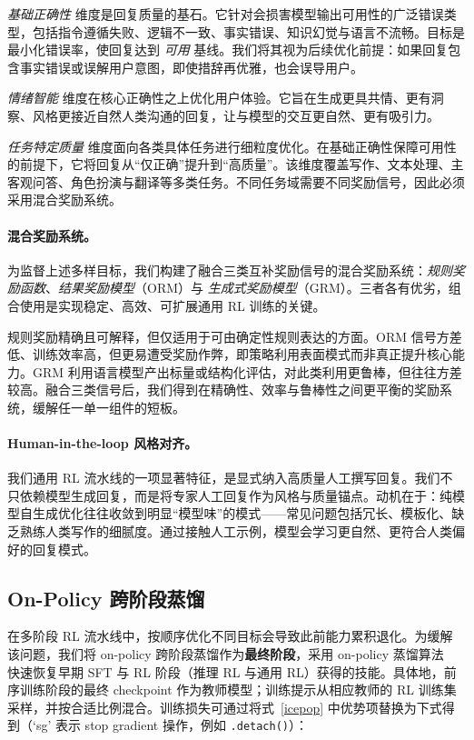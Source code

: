 \emph{基础正确性} 维度是回复质量的基石。它针对会损害模型输出可用性的广泛错误类型，包括指令遵循失败、逻辑不一致、事实错误、知识幻觉与语言不流畅。目标是最小化错误率，使回复达到 \emph{可用} 基线。我们将其视为后续优化前提：如果回复包含事实错误或误解用户意图，即使措辞再优雅，也会误导用户。

\emph{情绪智能} 维度在核心正确性之上优化用户体验。它旨在生成更具共情、更有洞察、风格更接近自然人类沟通的回复，让与模型的交互更自然、更有吸引力。

\emph{任务特定质量} 维度面向各类具体任务进行细粒度优化。在基础正确性保障可用性的前提下，它将回复从“仅正确”提升到“高质量”。该维度覆盖写作、文本处理、主客观问答、角色扮演与翻译等多类任务。不同任务域需要不同奖励信号，因此必须采用混合奖励系统。

\paragraph{混合奖励系统。}
为监督上述多样目标，我们构建了融合三类互补奖励信号的混合奖励系统：\emph{规则奖励函数}、\emph{结果奖励模型}（ORM）与 \emph{生成式奖励模型}（GRM）。三者各有优劣，组合使用是实现稳定、高效、可扩展通用 RL 训练的关键。

规则奖励精确且可解释，但仅适用于可由确定性规则表达的方面。ORM 信号方差低、训练效率高，但更易遭受奖励作弊，即策略利用表面模式而非真正提升核心能力。GRM 利用语言模型产出标量或结构化评估，对此类利用更鲁棒，但往往方差较高。融合三类信号后，我们得到在精确性、效率与鲁棒性之间更平衡的奖励系统，缓解任一单一组件的短板。

\paragraph{Human-in-the-loop 风格对齐。}
我们通用 RL 流水线的一项显著特征，是显式纳入高质量人工撰写回复。我们不只依赖模型生成回复，而是将专家人工回复作为风格与质量锚点。动机在于：纯模型自生成优化往往收敛到明显“模型味”的模式——常见问题包括冗长、模板化、缺乏熟练人类写作的细腻度。通过接触人工示例，模型会学习更自然、更符合人类偏好的回复模式。

\subsection{On-Policy 跨阶段蒸馏}
在多阶段 RL 流水线中，按顺序优化不同目标会导致此前能力累积退化。为缓解该问题，我们将 on-policy 跨阶段蒸馏作为\textbf{最终阶段}，采用 on-policy 蒸馏算法~\cite{guminillm,qwen3,xiao2026mimov2flashtechnicalreport,lu2025onpolicydistillation} 快速恢复早期 SFT 与 RL 阶段（推理 RL 与通用 RL）获得的技能。具体地，前序训练阶段的最终 checkpoint 作为教师模型；训练提示从相应教师的 RL 训练集采样，并按合适比例混合。训练损失可通过将式~\ref{icepop} 中优势项替换为下式得到（`sg' 表示 stop gradient 操作，例如 \texttt{.detach()}）：

